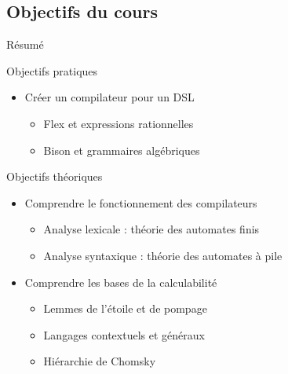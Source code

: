 
\begingroup

\subsection{Objectifs du cours}
\begin{frame}{Résumé}
  \begin{block}{Objectifs pratiques}
    \begin{itemize}
    \item Créer un compilateur pour un DSL 
      \begin{itemize}
      \item Flex et expressions rationnelles
      \item Bison et grammaires algébriques
      \end{itemize}
    \end{itemize}
  \end{block}
 
  \begin{block}{Objectifs théoriques}
    \begin{itemize}
    \item Comprendre le fonctionnement des compilateurs
      \begin{itemize}
      \item Analyse lexicale : théorie des automates finis
      \item Analyse syntaxique : théorie des automates à pile 
      \end{itemize}
    \item Comprendre les bases de la calculabilité
      \begin{itemize}
      \item Lemmes de l'étoile et de pompage 
      \item Langages contextuels et généraux
      \item Hiérarchie de Chomsky
      \end{itemize}
    \end{itemize}
  \end{block}
\end{frame}


\endgroup
